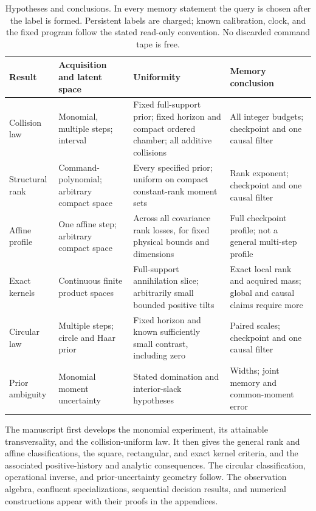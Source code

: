 \documentclass[11pt]{amsart}
\theoremstyle{definition}\newtheorem{definition}[theorem]{Definition}
\theoremstyle{remark}\newtheorem{remark}[theorem]{Remark}
\begin{document}
\begin{table}[tbp]
\centering\footnotesize
\setlength{\tabcolsep}{4pt}
\begin{tabular}{@{}p{}p{}p{}p{}@{}}
\toprule
Result & Acquisition and latent space & Uniformity & Memory conclusion\\
\midrule
Collision law & Monomial, multiple steps; interval & Fixed full-support
prior; fixed horizon and compact ordered chamber; all additive collisions
& All integer budgets; checkpoint and one causal filter\\[3pt]
Structural rank & Command-polynomial; arbitrary compact space & Every
specified prior; uniform on compact constant-rank moment sets & Rank
exponent; checkpoint and one causal filter\\[3pt]
Affine profile & One affine step; arbitrary compact space & Across all
covariance rank losses, for fixed physical bounds and dimensions & Full
checkpoint profile; not a general multi-step profile\\[3pt]
Exact kernels & Continuous finite product spaces & Full-support
annihilation slice; arbitrarily small bounded positive tilts & Exact local
rank and acquired mass; global and causal claims require more\\[3pt]
Circular law & Multiple steps; circle and Haar prior & Fixed horizon and
known sufficiently small contrast, including zero & Paired scales;
checkpoint and one causal filter\\[3pt]
Prior ambiguity & Monomial moment uncertainty & Stated domination and
interior-slack hypotheses & Widths; joint memory and common-moment error\\
\bottomrule
\end{tabular}
\caption{Hypotheses and conclusions. In every memory statement the query
is chosen after the label is formed. Persistent labels are charged;
known calibration, clock, and the fixed program follow the stated
read-only convention. No discarded command tape is free.}
\label{tab:scope}
\end{table}

The manuscript first develops the monomial experiment, its attainable
transversality, and the collision-uniform law. It then gives the general
rank and affine classifications, the square, rectangular, and exact
kernel criteria, and the associated positive-history and analytic
consequences. The circular classification, operational inverse, and
prior-uncertainty geometry follow. The observation algebra, confluent
specializations, sequential decision results, and numerical constructions
appear with their proofs in the appendices.
\end{document}
